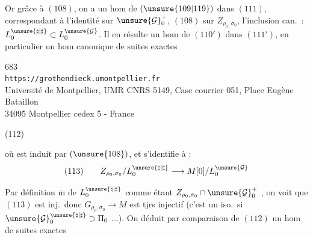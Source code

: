 Or grâce à $(108)$, on a un hom de $(\unsure{109|119})$ dans $(111)$,
correspondant à l'identité sur $\unsure{\mathcal G}_0^+$,
$(108)$ sur $Z_{\rho_0,\sigma_0}$, l'inclusion can.\ :
$L_0^{\unsure{\natural|\sharp}}\subset L_0^{\unsure{\mathcal G}}$.
Il en résulte un hom de $(110')$ dans $(111')$, en particulier un hom
canonique de suites exactes


\begin{center}
683\\
\texttt{https://grothendieck.umontpellier.fr}\\
Université de Montpellier, UMR CNRS 5149, Case courrier 051, Place Eugène Bataillon\\
34095 Montpellier cedex 5 - France
\end{center}



(112)\quad
{}

où
est  induit par
$(\unsure{108})$, et s'identifie à :
\[
(113)\qquad Z_{\rho_0,\sigma_0}/L_0^{\unsure{\natural|\sharp}}
\longrightarrow M[0]/L_0^{\unsure{\mathcal G}}
\]

Par définition $\overline{\mathrm m}$ de
$L_0^{\unsure{\natural|\sharp}}$ comme étant
$Z_{\rho_0,\sigma_0}\cap\unsure{\mathcal G}_0^+$
, on voit que $(113)$ est inj.\ donc
$G_{\rho_0,\sigma_0}\longrightarrow M$ est tjrs injectif
(c'est un iso.\ si
$\unsure{\mathcal G}_0^{\unsure{\natural|\sharp}}\supset\Pi_0$
$\ldots$).
On déduit par comparaison de $(112)$ un hom de suites exactes

